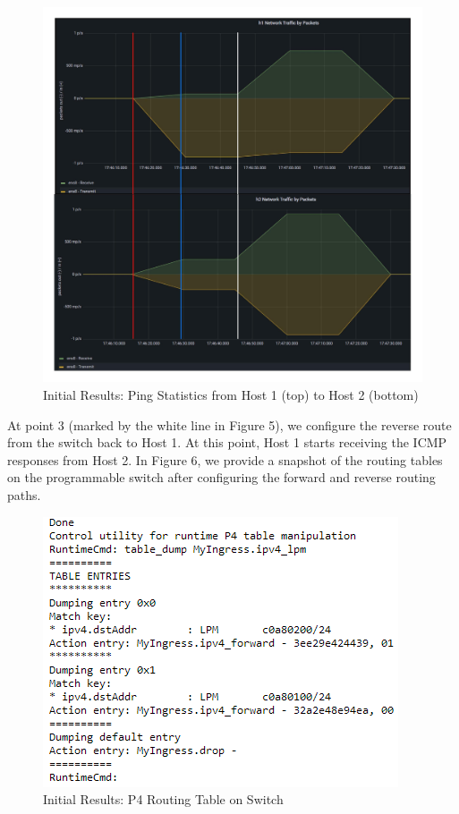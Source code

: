 \documentclass[conference]{IEEEtran}
\begin{document}
    \begin{figure}[b]
        \includegraphics[scale=0.35]{packetgraph.jpeg}
        \centering
        \caption{Initial Results: Ping Statistics from Host 1 (top) to Host 2 (bottom)}
    \end{figure}

    At point 3 (marked by the white line in Figure 5), we configure the reverse route from the switch back to Host 1. At this point, Host 1 starts receiving the ICMP responses from Host 2. In Figure 6, we provide a snapshot of the routing tables on the programmable switch after configuring the forward and reverse routing paths.

    \begin{figure}[t]
        \includegraphics[scale=0.4]{Switch_Routing_Table.png}
        \centering
        \caption{Initial Results: P4 Routing Table on Switch}
    \end{figure}
\end{document}
